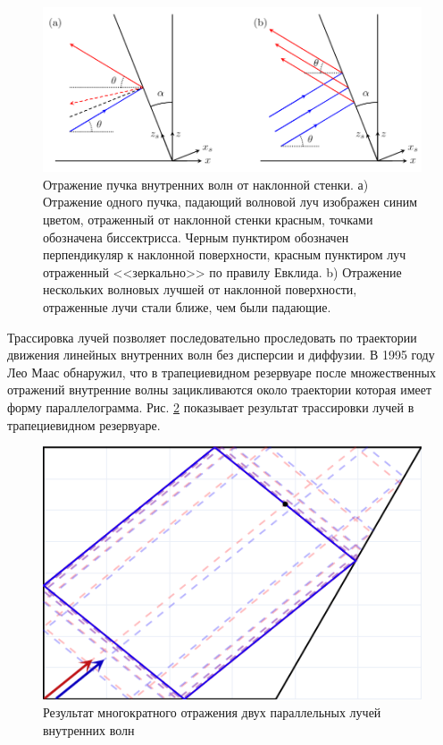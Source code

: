 \begin{figure}
    \centering
    \includegraphics[scale=0.5]{Figs/angle_of_reflection.png}
    \caption{Отражение пучка внутренних волн от наклонной стенки. а) Отражение одного пучка, падающий волновой луч изображен синим цветом, отраженный от наклонной стенки красным, точками обозначена биссектрисса. Черным пунктиром обозначен перпендикуляр к наклонной поверхности, красным пунктиром луч отраженный <<зеркально>> по правилу Евклида. b) Отражение нескольких волновых лучшей от наклонной поверхности, отраженные лучи стали ближе, чем были падающие.}
    \label{fig:internalReflection}
\end{figure}

Трассировка лучей позволяет последовательно проследовать по траектории движения линейных внутренних волн без дисперсии и диффузии. В 1995 году Лео Маас обнаружил, что в трапециевидном резервуаре после множественных отражений внутренние волны зацикливаются около траектории которая имеет форму параллелограмма\cite{Maas1995}. Рис. \ref{fig:RayTr} показывает результат трассировки лучей в трапециевидном резервуаре.

\begin{figure}
    \centering
    \includegraphics[scale=0.8]{Figs/RayTracing.png}
    \caption{Результат многократного отражения двух параллельных лучей внутренних волн}
    \label{fig:RayTr}
\end{figure}

